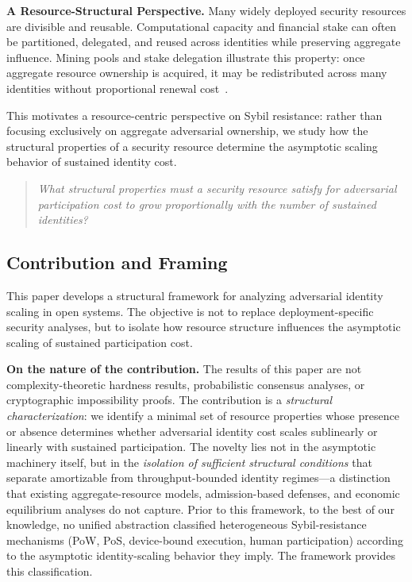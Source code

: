 \documentclass[journal]{IEEEtran}
\begin{document}
	\medskip
	\noindent
	\textbf{A Resource-Structural Perspective.}
	Many widely deployed security resources are divisible and
	reusable.
	Computational capacity and financial stake can often be
	partitioned, delegated, and reused across identities while
	preserving aggregate influence.
	Mining pools and stake delegation illustrate this property:
	once aggregate resource ownership is acquired, it may be
	redistributed across many identities without proportional
	renewal cost~\cite{rosenfeld2011analysis,
		gencer2018decentralization,
		kiayias2017ouroboros,saleh2021blockchain}.
	
	This motivates a resource-centric perspective on Sybil
	resistance:
	rather than focusing exclusively on aggregate adversarial
	ownership, we study how the structural properties of a
	security resource determine the asymptotic scaling behavior
	of sustained identity cost.
	
	\begin{quote}
		\emph{What structural properties must a security resource
			satisfy for adversarial participation cost to grow
			proportionally with the number of sustained identities?}
	\end{quote}
	
	\subsection{Contribution and Framing}
	
	This paper develops a structural framework for analyzing
	adversarial identity scaling in open systems.
	The objective is not to replace deployment-specific security
	analyses, but to isolate how resource structure influences
	the asymptotic scaling of sustained participation cost.
	
	\medskip
	\noindent\textbf{On the nature of the contribution.}
	The results of this paper are not complexity-theoretic hardness
	results, probabilistic consensus analyses, or cryptographic
	impossibility proofs.
	The contribution is a \emph{structural characterization}:
	we identify a minimal set of resource properties whose
	presence or absence determines whether adversarial identity
	cost scales sublinearly or linearly with sustained participation.
	The novelty lies not in the asymptotic machinery itself,
	but in the \emph{isolation of sufficient structural conditions}
	that separate amortizable from throughput-bounded identity
	regimes---a distinction that existing aggregate-resource models,
	admission-based defenses, and economic equilibrium analyses
	do not capture.
	Prior to this framework, to the best of our knowledge,
	no unified abstraction classified
	heterogeneous Sybil-resistance mechanisms (PoW, PoS,
	device-bound execution, human participation) according to the
	asymptotic identity-scaling behavior they imply.
	The framework provides this classification.
	
\end{document}
